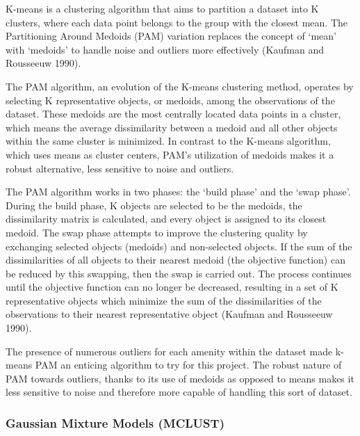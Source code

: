 \documentclass[11pt, a4paper]{article}
\begin{document}
K-means is a clustering algorithm that aims to partition a dataset into K clusters, where each data point belongs to the group with the closest mean. The Partitioning Around Medoids (PAM) variation replaces the concept of `mean' with `medoids' to handle noise and outliers more effectively  (Kaufman and Rousseeuw 1990).
\par
The PAM algorithm, an evolution of the K-means clustering method, operates by selecting K representative objects, or medoids, among the observations of the dataset. These medoids are the most centrally located data points in a cluster, which means the average dissimilarity between a medoid and all other objects within the same cluster is minimized. In contrast to the K-means algorithm, which uses means as cluster centers, PAM's utilization of medoids makes it a robust alternative, less sensitive to noise and outliers.
\par
The PAM algorithm works in two phases: the `build phase' and the `swap phase'. During the build phase, K objects are selected to be the medoids, the dissimilarity matrix is calculated, and every object is assigned to its closest medoid. The swap phase attempts to improve the clustering quality by exchanging selected objects (medoids) and non-selected objects. If the sum of the dissimilarities of all objects to their nearest medoid (the objective function) can be reduced by this swapping, then the swap is carried out. The process continues until the objective function can no longer be decreased, resulting in a set of K representative objects which minimize the sum of the dissimilarities of the observations to their nearest representative object (Kaufman and Rousseeuw 1990).
\par
The presence of numerous outliers for each amenity within the dataset made k-means PAM an enticing algorithm to try for this project. The robust nature of PAM towards outliers, thanks to its use of medoids as opposed to means makes it less sensitive to noise and therefore more capable of handling this sort of dataset. 





\subsubsection{Gaussian Mixture Models (MCLUST)} 
\end{document}
